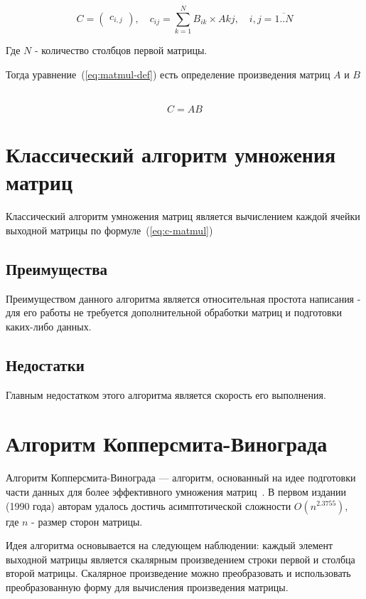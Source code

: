 \begin{equation}
    \label{eq:c-matmul}
    C = \begin{pmatrix}
        c_{i,j}
    \end{pmatrix}, \quad c_{ij} = \sum\limits_{ k=1}^{ N} {B_{ik} \times A{kj}}, \quad i,j = \overline{1..N} 
\end{equation}

Где $N$ - количество столбцов первой матрицы.

Тогда уравнение~(\ref{eq:matmul-def}) есть определение произведения матриц $A$ и $B$~\cite{matrix-citation}

\begin{equation}
    \label{eq:matmul-def}
    C = AB
\end{equation}

\section{Классический алгоритм умножения матриц}

Классический алгоритм умножения матриц является вычислением каждой ячейки выходной матрицы по формуле~(\ref{eq:c-matmul})

\subsection{Преимущества}

Преимуществом данного алгоритма является относительная простота написания - для его работы не требуется дополнительной обработки матриц и подготовки каких-либо данных.

\subsection{Недостатки}

Главным недостатком этого алгоритма является скорость его выполнения.

\section{Алгоритм Копперсмита-Винограда}

Алгоритм Копперсмита-Винограда --- алгоритм, основанный на идее подготовки части данных для более эффективного умножения матриц~\cite{Winograd}. В первом издании (1990 года) авторам удалось достичь асимптотической сложности $O(n^{2.3755})$, где $n$ - размер сторон матрицы.

Идея алгоритма основывается на следующем наблюдении: каждый элемент выходной матрицы является скалярным произведением строки первой и столбца второй матрицы. Скалярное произведение можно преобразовать и использовать преобразованную форму для вычисления произведения матрицы.

